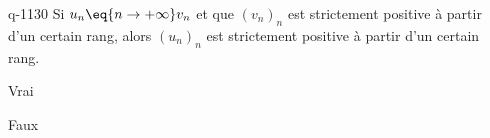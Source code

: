 \begin{truefalse}{q-1130}
Si $u_n \eq{n\to+\infty} v_n$ et que $(v_n)_n$ est strictement positive à partir d'un certain rang, alors $(u_n)_n$ est strictement positive à partir d'un certain rang.
\item* Vrai
\item Faux
\end{truefalse}

